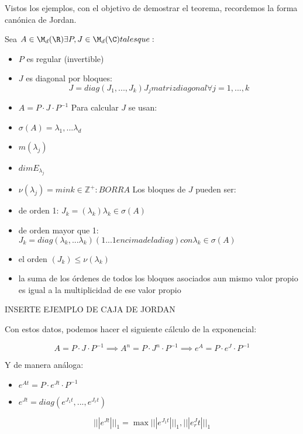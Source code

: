 
Vistos los ejemplos, con el objetivo de demostrar el teorema, recordemos la forma canónica de Jordan.

Sea $A \in \M_d(\R) \exists P, J \in \M_d(\C) tales que:$
\begin{itemize}
\item $P$ es regular (invertible)
\item $J$ es diagonal por bloques:
\begin{equation}
J=diag(J_1,...,J_k) J_j matriz diagonal \forall j=1,...,k
\end{equation}
\item $A=P\cdot J\cdot P^{-1}$
Para calcular $J$ se usan:
\item $\sigma(A)={\lambda_1,...\lambda_d}$
\item $m(\lambda_j)$
\item $dim E_{\lambda_j}$
\item $\nu(\lambda_j)=min{k\in\mathbb{Z}^+: BORRA}$
Los bloques de $J$ pueden ser:
\item de orden 1: $J_k=(\lambda_k) \lambda_k \in \sigma(A)$
\item de orden mayor que 1: $J_k=diag(\lambda_k,...\lambda_k) (1...1 encima de la diag) con \lambda_k \in \sigma(A)$
\item el orden $(J_k) \leq \nu(\lambda_k)$
\item la suma de los órdenes de todos los bloques asociados aun mismo valor propio es igual a la multiplicidad de ese valor propio
\end{itemize}

INSERTE EJEMPLO DE CAJA DE JORDAN

Con estos datos, podemos hacer el siguiente cálculo de la exponencial:

$$A=P\cdot J \cdot P^{-1} \implies A^n=P \cdot J^n \cdot P^{-1} \implies e^A=P \cdot e^J \cdot P^{-1}$$

Y de manera análoga:
\begin{itemize}
\item $e^{At}=P \cdot e^{Jt} \cdot P^{-1}$
\item $e^{Jt}=diag(e^{J_1t},...,e^{J_rt} )$
\end{itemize}


\begin{lema}
$$|||e^{Jt}|||_1=\max{|||e^{J_1t}|||_1,|||e^J_rt|||_1}$$
\end{lema}

